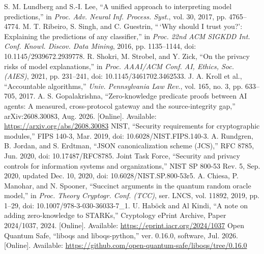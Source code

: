  S. M. Lundberg and S.-I. Lee, ``A unified approach to interpreting model predictions,'' in \emph{Proc. Adv. Neural Inf. Process. Syst.}, vol. 30, 2017, pp. 4765--4774.
 M. T. Ribeiro, S. Singh, and C. Guestrin, ``\,`Why should I trust you?': Explaining the predictions of any classifier,'' in \emph{Proc. 22nd ACM SIGKDD Int. Conf. Knowl. Discov. Data Mining}, 2016, pp. 1135--1144, doi: 10.1145/2939672.2939778.
 R. Shokri, M. Strobel, and Y. Zick, ``On the privacy risks of model explanations,'' in \emph{Proc. AAAI/ACM Conf. AI, Ethics, Soc. (AIES)}, 2021, pp. 231--241, doi: 10.1145/3461702.3462533.
 J. A. Kroll et al., ``Accountable algorithms,'' \emph{Univ. Pennsylvania Law Rev.}, vol. 165, no. 3, pp. 633--705, 2017.
 A. S. Gopalakrishna, ``Zero-knowledge predicate proofs between AI agents: A measured, cross-protocol gateway and the source-integrity gap,'' arXiv:2608.30083, Aug. 2026. [Online]. Available: \url{https://arxiv.org/abs/2608.30083}
 NIST, ``Security requirements for cryptographic modules,'' FIPS 140-3, Mar. 2019, doi: 10.6028/NIST.FIPS.140-3.
 A. Rundgren, B. Jordan, and S. Erdtman, ``JSON canonicalization scheme (JCS),'' RFC 8785, Jun. 2020, doi: 10.17487/RFC8785.
 Joint Task Force, ``Security and privacy controls for information systems and organizations,'' NIST SP 800-53 Rev. 5, Sep. 2020, updated Dec. 10, 2020, doi: 10.6028/NIST.SP.800-53r5.
 A. Chiesa, P. Manohar, and N. Spooner, ``Succinct arguments in the quantum random oracle model,'' in \emph{Proc. Theory Cryptogr. Conf. (TCC)}, ser. LNCS, vol. 11892, 2019, pp. 1--29, doi: 10.1007/978-3-030-36033-7\_1.
 U. Hab\"ock and Al Kindi, ``A note on adding zero-knowledge to STARKs,'' Cryptology ePrint Archive, Paper 2024/1037, 2024. [Online]. Available: \url{https://eprint.iacr.org/2024/1037}
 Open Quantum Safe, ``liboqs and liboqs-python,'' ver. 0.16.0, software, Jul. 2026. [Online]. Available: \url{https://github.com/open-quantum-safe/liboqs/tree/0.16.0}
